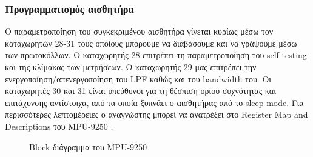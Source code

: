 \documentclass{article}
\begin{document}
\subsubsection{Προγραμματισμός αισθητήρα}
Ο παραμετροποίηση του συγκεκριμένου αισθητήρα γίνεται κυρίως μέσω τον καταχωρητών 28-31 τους οποίους μπορούμε να διαβάσουμε και να γράψουμε μέσω των πρωτοκόλλων. Ο καταχωρητής 28 επιτρέπει τη παραμετροποίηση του self-testing και της κλίμακας των μετρήσεων. Ο καταχωρητής 29 μας επιτρέπει την ενεργοποίηση/απ\-ενεργοποίηση του LPF καθώς και του bandwidth του. Οι καταχωρητές 30 και 31 είναι υπεύθυνοι για τη θέσπιση ορίου συχνότητας και επιτάχυνσης αντίστοιχα, από τα οποία ξυπνάει ο αισθητήρας από το sleep mode. Για περισσότερες λεπτομέρειες ο αναγνώστης μπορεί να ανατρέξει στο Register Map and Descriptions του MPU-9250 \cite{evensense1:20}.

\begin{figure}[H]
  \caption{Block διάγραμμα του MPU-9250 \cite{evensense:20}}
  \label{fig:mpu-9250-block-diagram}
\end{figure}
\end{document}
